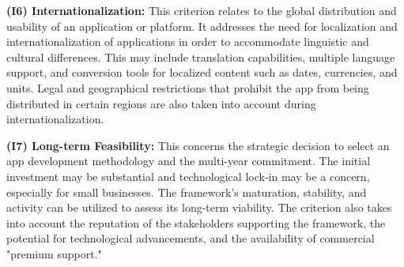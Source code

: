 \textbf{(I6) Internationalization:}
This criterion relates to the global distribution and usability of an application or platform. It addresses the need for localization and internationalization of applications in order to accommodate linguistic and cultural differences. This may include translation capabilities, multiple language support, and conversion tools for localized content such as dates, currencies, and units. Legal and geographical restrictions that prohibit the app from being distributed in certain regions are also taken into account during internationalization.

\textbf{(I7) Long-term Feasibility:}
This concerns the strategic decision to select an app development methodology and the multi-year commitment. The initial investment may be substantial and technological lock-in may be a concern, especially for small businesses. The framework's maturation, stability, and activity can be utilized to assess its long-term viability. The criterion also takes into account the reputation of the stakeholders supporting the framework, the potential for technological advancements, and the availability of commercial "premium support."